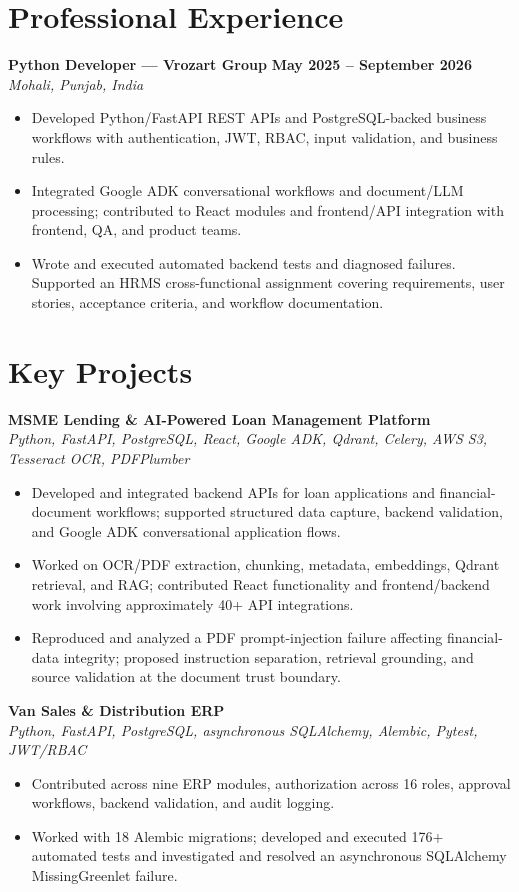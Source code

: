 \documentclass[a4paper,10pt]{article}
\newcommand{\project}[2]{\vspace{3pt}\textbf{#1}\\{\small\textit{#2}}\vspace{1pt}}
\begin{document}
\section*{Professional Experience}
\textbf{Python Developer --- Vrozart Group} \hfill \textbf{May 2025 -- September 2026}\\
\textit{Mohali, Punjab, India}
\begin{itemize}
  \item Developed Python/FastAPI REST APIs and PostgreSQL-backed business workflows with authentication,
  JWT, RBAC, input validation, and business rules.
  \item Integrated Google ADK conversational workflows and document/LLM processing; contributed to
  React modules and frontend/API integration with frontend, QA, and product teams.
  \item Wrote and executed automated backend tests and diagnosed failures. Supported an HRMS cross-functional
  assignment covering requirements, user stories, acceptance criteria, and workflow documentation.
\end{itemize}

\section*{Key Projects}
\project{MSME Lending \& AI-Powered Loan Management Platform}
{Python, FastAPI, PostgreSQL, React, Google ADK, Qdrant, Celery, AWS S3, Tesseract OCR, PDFPlumber}
\begin{itemize}
  \item Developed and integrated backend APIs for loan applications and financial-document workflows;
  supported structured data capture, backend validation, and Google ADK conversational application flows.
  \item Worked on OCR/PDF extraction, chunking, metadata, embeddings, Qdrant retrieval, and RAG;
  contributed React functionality and frontend/backend work involving approximately 40+ API integrations.
  \item Reproduced and analyzed a PDF prompt-injection failure affecting financial-data integrity; proposed
  instruction separation, retrieval grounding, and source validation at the document trust boundary.
\end{itemize}

\project{Van Sales \& Distribution ERP}
{Python, FastAPI, PostgreSQL, asynchronous SQLAlchemy, Alembic, Pytest, JWT/RBAC}
\begin{itemize}
  \item Contributed across nine ERP modules, authorization across 16 roles, approval workflows,
  backend validation, and audit logging.
  \item Worked with 18 Alembic migrations; developed and executed 176+ automated tests and
  investigated and resolved an asynchronous SQLAlchemy MissingGreenlet failure.
\end{itemize}
\end{document}
